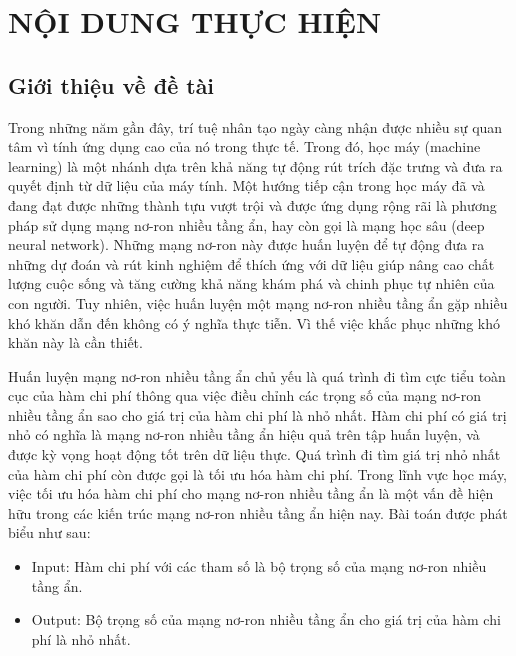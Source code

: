 \documentclass{article}[14pt]
\begin{document}
    \section{NỘI DUNG THỰC HIỆN}
    {

    
    \subsection{Giới thiệu về đề tài}
    Trong những năm gần đây, trí tuệ nhân tạo ngày càng nhận được nhiều sự quan tâm vì tính ứng dụng cao của nó trong thực tế. Trong đó, học máy (machine learning) là một nhánh dựa trên khả năng tự động rút trích đặc trưng và đưa ra quyết định từ dữ liệu của máy tính. Một hướng tiếp cận trong học máy đã và đang đạt được những thành tựu vượt trội và được ứng dụng rộng rãi là phương pháp sử dụng mạng nơ-ron nhiều tầng ẩn, hay còn gọi là mạng học sâu (deep neural network). Những mạng nơ-ron này được huấn luyện để tự động đưa ra những dự đoán và rút kinh nghiệm để thích ứng với dữ liệu giúp nâng cao chất lượng cuộc sống và tăng cường khả năng khám phá và chinh phục tự nhiên của con người. Tuy nhiên, việc huấn luyện một mạng nơ-ron nhiều tầng ẩn gặp nhiều khó khăn dẫn đến không có ý nghĩa thực tiễn. Vì thế việc khắc phục những khó khăn này là cần thiết. \par
    
    Huấn luyện mạng nơ-ron nhiều tầng ẩn chủ yếu là quá trình đi tìm cực tiểu toàn cục của hàm chi phí thông qua việc điều chỉnh các trọng số của mạng nơ-ron nhiều tầng ẩn sao cho giá trị của hàm chi phí là nhỏ nhất. Hàm chi phí có giá trị nhỏ có nghĩa là mạng nơ-ron nhiều tầng ẩn hiệu quả trên tập huấn luyện, và được kỳ vọng hoạt động tốt trên dữ liệu thực. Quá trình đi tìm giá trị nhỏ nhất của hàm chi phí còn được gọi là tối ưu hóa hàm chi phí. Trong lĩnh vực học máy, việc tối ưu hóa hàm chi phí cho mạng nơ-ron nhiều tầng ẩn là một vấn đề hiện hữu trong các kiến trúc mạng nơ-ron nhiều tầng ẩn hiện nay. Bài toán được phát biểu như sau: \par
   \begin{itemize}
      \item Input: Hàm chi phí với các tham số là bộ trọng số của mạng nơ-ron nhiều tầng ẩn.
      \item Output: Bộ trọng số của mạng nơ-ron nhiều tầng ẩn cho giá trị của hàm chi phí là nhỏ nhất.
    \end{itemize}
    
}
\end{document}
